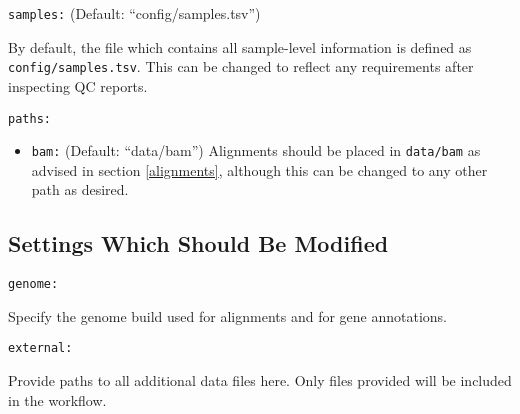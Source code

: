 \documentclass[
]{book}
\providecommand{\tightlist}{%
  \setlength{\itemsep}{0pt}\setlength{\parskip}{0pt}}
\begin{document}
\texttt{samples:} (Default: ``config/samples.tsv'')

By default, the file which contains all sample-level information is defined as \texttt{config/samples.tsv}.
This can be changed to reflect any requirements after inspecting QC reports.

\texttt{paths:}

\begin{itemize}
\tightlist
\item
  \texttt{bam:} (Default: ``data/bam'') Alignments should be placed in \texttt{data/bam} as advised in section \ref{alignments}, although this can be changed to any other path as desired.
\end{itemize}

\hypertarget{settings-which-should-be-modified}{%
\subsection*{Settings Which Should Be Modified}\label{settings-which-should-be-modified}}

\texttt{genome:}

Specify the genome build used for alignments and for gene annotations.

\texttt{external:}

Provide paths to all additional data files here.
Only files provided will be included in the workflow.
\end{document}
